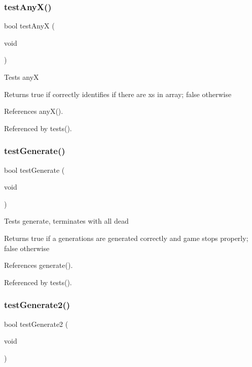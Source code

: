 \subsubsection{test\+Any\+X()}
{\footnotesize\ttfamily bool test\+AnyX (\begin{DoxyParamCaption}\item[{void}]{ }\end{DoxyParamCaption})}

Tests anyX \begin{DoxyReturn}{Returns}
true if correctly identifies if there are x\textquotesingle{}s in array; false otherwise 
\end{DoxyReturn}


References any\+X().



Referenced by tests().

\mbox{\label{tests_8c_a452bec98ef4419a18c4f15592208ee7b}} 
\subsubsection{test\+Generate()}
{\footnotesize\ttfamily bool test\+Generate (\begin{DoxyParamCaption}\item[{void}]{ }\end{DoxyParamCaption})}

Tests generate, terminates with all dead \begin{DoxyReturn}{Returns}
true if a generations are generated correctly and game stops properly; false otherwise 
\end{DoxyReturn}


References generate().



Referenced by tests().

\mbox{\label{tests_8c_a2b06f6173fe50a78583de1d41af922d5}} 
\subsubsection{test\+Generate2()}
{\footnotesize\ttfamily bool test\+Generate2 (\begin{DoxyParamCaption}\item[{void}]{ }\end{DoxyParamCaption})}

